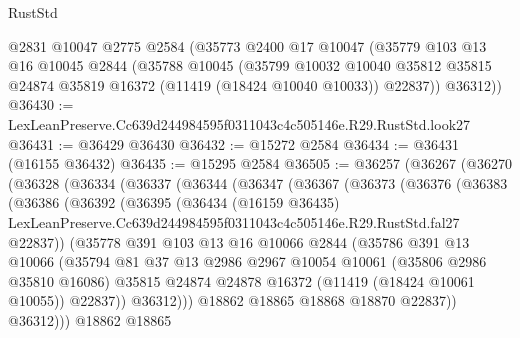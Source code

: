 \begin{lexlean}{RustStd}
\begin{coremodule}
    @2831
    @10047
    @2775
    @2584
    (@35773
      @2400
      @17
      @10047
      (@35779
        @103
        @13
        @16
        @10045
        @2844
        (@35788
          @10045
          (@35799
            @10032
            @10040
            @35812
            @35815
            @24874
            @35819
            @16372
            (@11419 (@18424 @10040 @10033))
            @22837))
        @36312))
@36430 := LexLeanPreserve.Cc639d244984595f0311043c4c505146e.R29.RustStd.look27
@36431 := @36429 @36430
@36432 := @15272 @2584
@36434 := @36431 (@16155 @36432)
@36435 := @15295 @2584
@36505 := @36257
    (@36267
      (@36270
        (@36328
          (@36334
            (@36337
              (@36344
                (@36347
                  (@36367
                    (@36373
                      (@36376
                        (@36383
                          (@36386
                            (@36392
                              (@36395
                                (@36434
                                  (@16159 @36435)
                                  LexLeanPreserve.Cc639d244984595f0311043c4c505146e.R29.RustStd.fal27
                                  @22837))
                              (@35778
                                @391
                                @103
                                @13
                                @16
                                @10066
                                @2844
                                (@35786
                                  @391
                                  @13
                                  @10066
                                  (@35794
                                    @81
                                    @37
                                    @13
                                    @2986
                                    @2967
                                    @10054
                                    @10061
                                    (@35806 @2986 @35810 @16086)
                                    @35815
                                    @24874
                                    @24878
                                    @16372
                                    (@11419 (@18424 @10061 @10055))
                                    @22837))
                                @36312)))
                          @18862
                          @18865
                          @18868
                          @18870
                          @22837))
                      @36312)))
                @18862
                @18865

\end{coremodule}
\end{lexlean}
